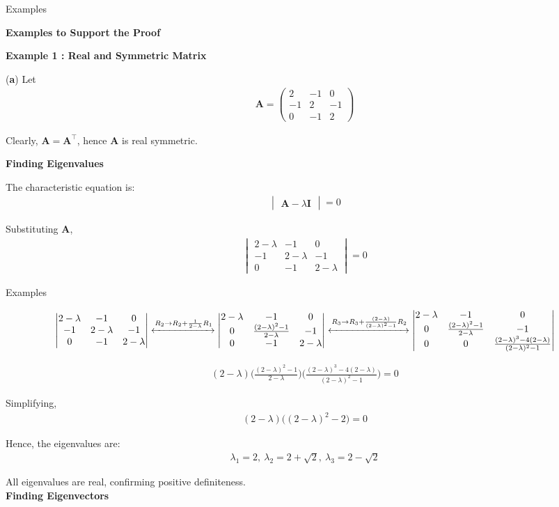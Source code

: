 \documentclass{beamer}
\numberwithin{equation}{section}
\theoremstyle{remark}
\newcommand{\myvec}[1]{\ensuremath{\begin{pmatrix}#1\end{pmatrix}}}
\newcommand{\mydet}[1]{\ensuremath{\begin{vmatrix}#1\end{vmatrix}}}
\let\vec\mathbf
\begin{document}
\begin{frame}{Examples}

\textbf{Examples to Support the Proof} 

\textbf{Example 1 : Real and Symmetric Matrix }

(\textbf{a}) Let
\begin{align}
\vec{A} = \myvec{2 & -1 & 0\\ -1 & 2 & -1\\ 0 & -1 & 2}
\end{align}

Clearly, $\vec{A} = \vec{A}^\top$, hence $\vec{A}$ is real symmetric.

\textbf{Finding Eigenvalues}

The characteristic equation is:
\begin{align}
\mydet{\vec{A} - \lambda \vec{I}} = 0
\end{align}

Substituting $\vec{A}$,
\begin{align}
\mydet{
2-\lambda & -1 & 0\\
-1 & 2-\lambda & -1\\
0 & -1 & 2-\lambda
}= 0
\end{align}

\end{frame}

\begin{frame}{Examples}

\begin{align}
\mydet{
2-\lambda & -1 & 0\\
-1 & 2-\lambda & -1\\
0 & -1 & 2-\lambda
}
\xleftrightarrow{R_2 \to R_2 + \frac{1}{2-\lambda}R_1}
\mydet{
2-\lambda & -1 & 0\\
0 & \frac{(2-\lambda)^2 - 1}{2-\lambda} & -1\\
0 & -1 & 2-\lambda
}
\xleftrightarrow{R_3 \to R_3 + \frac{(2-\lambda)}{(2-\lambda)^2 - 1}R_2}
\mydet{
2-\lambda & -1 & 0\\
0 & \frac{(2-\lambda)^2 - 1}{2-\lambda} & -1\\
0 & 0 & \frac{(2-\lambda)^3 - 4(2-\lambda)}{(2-\lambda)^2 - 1}
}
\end{align}

\begin{align}
(2-\lambda)\Big(\frac{(2-\lambda)^2 - 1}{2-\lambda}\Big)\Big(\frac{(2-\lambda)^3 - 4(2-\lambda)}{(2-\lambda)^2 - 1}\Big) = 0
\end{align}

Simplifying,
\begin{align}
(2-\lambda)\big((2-\lambda)^2 - 2\big) = 0
\end{align}

Hence, the eigenvalues are:
\begin{align}
\lambda_1 = 2,\ \lambda_2 = 2 + \sqrt{2},\ \lambda_3 = 2 - \sqrt{2}
\end{align}

All eigenvalues are real, confirming positive definiteness.\\

\textbf{Finding Eigenvectors}

\end{frame}
\end{document}
